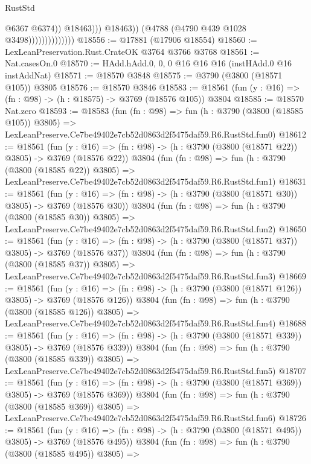 \begin{lexlean}{RustStd}
\begin{coremodule}
                                          @6367
                                          @6374))
                                      @18463)))
                                @18463))
                            (@4788 (@4790 @439 @1028 @3498))))))))))))))
@18556 := @17881 (@17906 @18554)
@18560 := LexLeanPreservation.Rust.CrateOK @3764 @3766 @3768
@18561 := Nat.casesOn.{0}
@18570 := HAdd.hAdd.{0, 0, 0} @16 @16 @16 (instHAdd.{0} @16 instAddNat)
@18571 := @18570 @3848
@18575 := @3790 (@3800 (@18571 @105)) @3805
@18576 := @18570 @3846
@18583 := @18561 (fun (y : @16) => (fn : @98) -> (h : @18575) -> @3769 (@18576 @105)) @3804
@18585 := @18570 Nat.zero
@18593 := @18583
    (fun (fn : @98) =>
    fun (h : @3790 (@3800 (@18585 @105)) @3805) =>
    LexLeanPreserve.Ce7be49402e7cb52d0863d2f5475daf59.R6.RustStd.fun0)
@18612 := @18561
    (fun (y : @16) => (fn : @98) -> (h : @3790 (@3800 (@18571 @22)) @3805) -> @3769 (@18576 @22))
    @3804
    (fun (fn : @98) =>
    fun (h : @3790 (@3800 (@18585 @22)) @3805) =>
    LexLeanPreserve.Ce7be49402e7cb52d0863d2f5475daf59.R6.RustStd.fun1)
@18631 := @18561
    (fun (y : @16) => (fn : @98) -> (h : @3790 (@3800 (@18571 @30)) @3805) -> @3769 (@18576 @30))
    @3804
    (fun (fn : @98) =>
    fun (h : @3790 (@3800 (@18585 @30)) @3805) =>
    LexLeanPreserve.Ce7be49402e7cb52d0863d2f5475daf59.R6.RustStd.fun2)
@18650 := @18561
    (fun (y : @16) => (fn : @98) -> (h : @3790 (@3800 (@18571 @37)) @3805) -> @3769 (@18576 @37))
    @3804
    (fun (fn : @98) =>
    fun (h : @3790 (@3800 (@18585 @37)) @3805) =>
    LexLeanPreserve.Ce7be49402e7cb52d0863d2f5475daf59.R6.RustStd.fun3)
@18669 := @18561
    (fun (y : @16) => (fn : @98) -> (h : @3790 (@3800 (@18571 @126)) @3805) -> @3769 (@18576 @126))
    @3804
    (fun (fn : @98) =>
    fun (h : @3790 (@3800 (@18585 @126)) @3805) =>
    LexLeanPreserve.Ce7be49402e7cb52d0863d2f5475daf59.R6.RustStd.fun4)
@18688 := @18561
    (fun (y : @16) => (fn : @98) -> (h : @3790 (@3800 (@18571 @339)) @3805) -> @3769 (@18576 @339))
    @3804
    (fun (fn : @98) =>
    fun (h : @3790 (@3800 (@18585 @339)) @3805) =>
    LexLeanPreserve.Ce7be49402e7cb52d0863d2f5475daf59.R6.RustStd.fun5)
@18707 := @18561
    (fun (y : @16) => (fn : @98) -> (h : @3790 (@3800 (@18571 @369)) @3805) -> @3769 (@18576 @369))
    @3804
    (fun (fn : @98) =>
    fun (h : @3790 (@3800 (@18585 @369)) @3805) =>
    LexLeanPreserve.Ce7be49402e7cb52d0863d2f5475daf59.R6.RustStd.fun6)
@18726 := @18561
    (fun (y : @16) => (fn : @98) -> (h : @3790 (@3800 (@18571 @495)) @3805) -> @3769 (@18576 @495))
    @3804
    (fun (fn : @98) =>
    fun (h : @3790 (@3800 (@18585 @495)) @3805) =>

\end{coremodule}
\end{lexlean}
